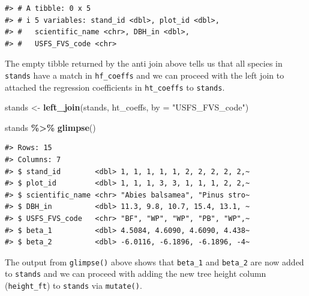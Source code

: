 \documentclass[
  11pt,
]{krantz}
\newenvironment{Shaded}{\begin{snugshade}}{\end{snugshade}}
\newcommand{\DataTypeTok}[1]{\textcolor[rgb]{0.13,0.29,0.53}{#1}}
\newcommand{\KeywordTok}[1]{\textcolor[rgb]{0.13,0.29,0.53}{\textbf{#1}}}
\newcommand{\NormalTok}[1]{#1}
\newcommand{\OperatorTok}[1]{\textcolor[rgb]{0.81,0.36,0.00}{\textbf{#1}}}
\newcommand{\StringTok}[1]{\textcolor[rgb]{0.31,0.60,0.02}{#1}}
\theoremstyle{definition}
\theoremstyle{definition}
\theoremstyle{definition}
\theoremstyle{definition}
\theoremstyle{remark}
\begin{document}
\begin{verbatim}
#> # A tibble: 0 x 5
#> # i 5 variables: stand_id <dbl>, plot_id <dbl>,
#> #   scientific_name <chr>, DBH_in <dbl>,
#> #   USFS_FVS_code <chr>
\end{verbatim}

The empty tibble returned by the anti join above tells us that all species in \texttt{stands} have a match in \texttt{hf\_coeffs} and we can proceed with the left join to attached the regression coefficients in \texttt{ht\_coeffs} to \texttt{stands}.

\begin{Shaded}
\begin{Highlighting}[]
\NormalTok{stands \textless{}{-}}\StringTok{ }\KeywordTok{left\_join}\NormalTok{(stands, ht\_coeffs, }\DataTypeTok{by =} \StringTok{"USFS\_FVS\_code"}\NormalTok{)}

\NormalTok{stands }\OperatorTok{\%\textgreater{}\%}\StringTok{ }\KeywordTok{glimpse}\NormalTok{()}
\end{Highlighting}
\end{Shaded}

\begin{verbatim}
#> Rows: 15
#> Columns: 7
#> $ stand_id        <dbl> 1, 1, 1, 1, 1, 2, 2, 2, 2, 2,~
#> $ plot_id         <dbl> 1, 1, 1, 3, 3, 1, 1, 1, 2, 2,~
#> $ scientific_name <chr> "Abies balsamea", "Pinus stro~
#> $ DBH_in          <dbl> 11.3, 9.8, 10.7, 15.4, 13.1, ~
#> $ USFS_FVS_code   <chr> "BF", "WP", "WP", "PB", "WP",~
#> $ beta_1          <dbl> 4.5084, 4.6090, 4.6090, 4.438~
#> $ beta_2          <dbl> -6.0116, -6.1896, -6.1896, -4~
\end{verbatim}

The output from \texttt{glimpse()} above shows that \texttt{beta\_1} and \texttt{beta\_2} are now added to \texttt{stands} and we can proceed with adding the new tree height column (\texttt{height\_ft}) to \texttt{stands} via \texttt{mutate()}.
\end{document}
